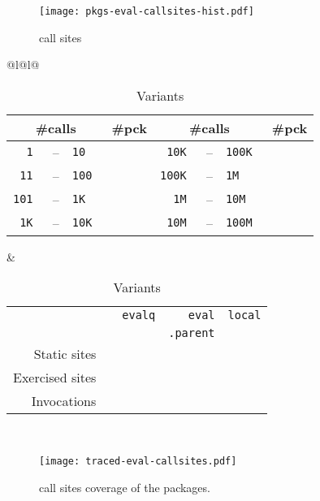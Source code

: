 \documentclass[review,screen,acmsmall]{acmart}%
\renewcommand{\k}[1]{\lstinline |#1|\xspace}
\begin{document}
\begin{figure}[H]
  \texttt{[image: pkgs-eval-callsites-hist.pdf]}
  \caption{ \eval call sites}\label{fig:pkgs-eval-callsites-hist}
\end{figure}
\begin{table}[H]
\centering
  \small
\begin{tabular}{@{}l@{\hspace{1.5cm}}l@{}}
\begin{minipage} {5cm}\small
  \begin{tabular}{r@{\,}r@{\,}l@{}r|r@{\,}r@{\,}l@{}r} \toprule
    \multicolumn{3}{c}{\bf \small\#calls} &\bf \small \#pck
&     \multicolumn{3}{c}{\bf \small\#calls} &\bf \small\#pck \\\midrule
\tt 1 &--& \tt 10      & \packageBina  & \tt 10K &--&\tt 100K  & \packageBine\\
\tt 11 &--& \tt 100    & \packageBinb  & \tt 100K &--&\tt 1M  & \packageBinf\\
\tt 101 &--& \tt 1K    & \packageBinc  & \tt 1M &--&\tt 10M   & \packageBing\\
\tt 1K &--& \tt 10K    & \packageBind  & \tt 10M &--& \tt 100M & \packageBinh\\\bottomrule
\end{tabular}
\caption{Call frequency}\label{tab:freq}
\end{minipage}
&
\begin{minipage}{7cm}\small
\begin{tabular}{@{\,}r|rrrr}\toprule
  &\eval & \k{evalq} & \k{eval} & \k{local}\\[-1.5mm]
           & & & \k{.parent} &\\\midrule
\small Static sites &\packageStaticeval&\packageStaticevalq&\packageStaticevalparent&\packageStaticlocal \\
\small Exercised sites&\packageTriggeredeval&\packageTriggeredevalq&\packageTriggeredevalparent&\packageTriggeredlocal\\
\small Invocations&\packageEvalsRnd&\packageEvalqsRnd&\packageEparentsRnd&\packageLocalsRnd\\\bottomrule
\end{tabular}~\\[2mm]\caption{Variants}\label{tab:variantseval}
\end{minipage}\end{tabular}

\end{table}
\begin{figure}[H]
  \texttt{[image: traced-eval-callsites.pdf]} \centering
  \caption{\eval call sites coverage of the \PkgPackages packages.}%
  \label{fig:traced-eval-callsites}
\end{figure}
\end{document}
